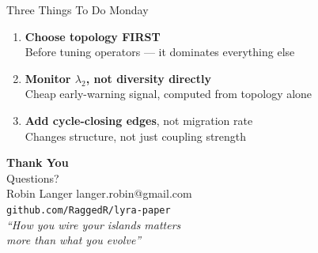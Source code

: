 \documentclass[aspectratio=169,14pt]{beamer}
\begin{document}
\begin{frame}{Three Things To Do Monday}
  \begin{enumerate}
    \item \textbf{Choose topology FIRST}\\
          {\small Before tuning operators --- it dominates everything else}

    \vspace{10pt}
    \item \textbf{Monitor $\lambda_2$, not diversity directly}\\
          {\small Cheap early-warning signal, computed from topology alone}

    \vspace{10pt}
    \item \textbf{Add cycle-closing edges}, not migration rate\\
          {\small Changes structure, not just coupling strength}
  \end{enumerate}
\end{frame}

{
\begin{frame}[plain]
  \vfill
  \begin{flushleft}
    \hspace{5mm}%
    \begin{minipage}{0.65\textwidth}
      {\Huge\bfseries\color{white} Thank You}\\[12pt]
      {\color{geccoAccent}\large Questions?}\\[18pt]
      {\small\color{white}
        Robin Langer \quad\textbar\quad langer.robin@gmail.com\\[4pt]
        \texttt{github.com/RaggedR/lyra-paper}}\\[12pt]
      {\small\color{gray!60}\itshape
        ``How you wire your islands matters\\
        more than what you evolve''}
    \end{minipage}
  \end{flushleft}
  \vfill
\end{frame}
}
\end{document}
